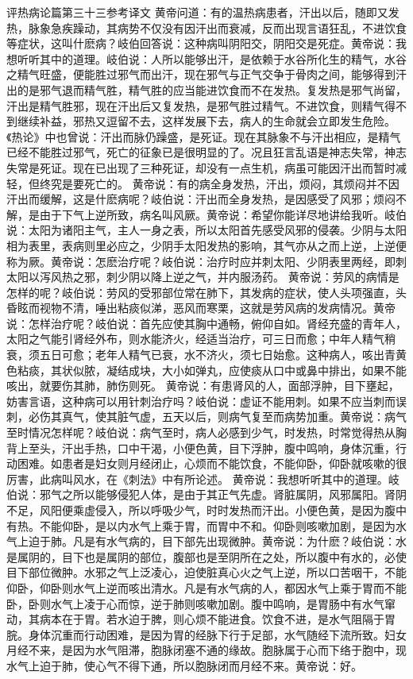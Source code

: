 \documentclass[a4paper,12pt,UTF8,twoside]{ctexbook}
\begin{document}
评热病论篇第三十三参考译文
黄帝问道：有的温热病患者，汗出以后，随即又发热，脉象急疾躁动，其病势不仅没有因汗出而衰减，反而出现言语狂乱，不进饮食等症状，这叫什麽病？岐伯回答说：这种病叫阴阳交，阴阳交是死症。黄帝说：我想听听其中的道理。岐伯说：人所以能够出汗，是依赖于水谷所化生的精气，水谷之精气旺盛，便能胜过邪气而出汗，现在邪气与正气交争于骨肉之间，能够得到汗出的是邪气退而精气胜，精气胜的应当能进饮食而不在发热。复发热是邪气尚留，汗出是精气胜邪，现在汗出后又复发热，是邪气胜过精气。不进饮食，则精气得不到继续补益，邪热又逗留不去，这样发展下去，病人的生命就会立即发生危险。《热论》中也曾说：汗出而脉仍躁盛，是死证。现在其脉象不与汗出相应，是精气已经不能胜过邪气，死亡的征象已是很明显的了。况且狂言乱语是神志失常，神志失常是死证。现在已出现了三种死证，却没有一点生机，病虽可能因汗出而暂时减轻，但终究是要死亡的。
黄帝说：有的病全身发热，汗出，烦闷，其烦闷并不因汗出而缓解，这是什麽病呢？岐伯说：汗出而全身发热，是因感受了风邪；烦闷不解，是由于下气上逆所致，病名叫风厥。黄帝说：希望你能详尽地讲给我听。岐伯说：太阳为诸阳主气，主人一身之表，所以太阳首先感受风邪的侵袭。少阴与太阳相为表里，表病则里必应之，少阴手太阳发热的影响，其气亦从之而上逆，上逆便称为厥。黄帝说：怎麽治疗呢？岐伯说：治疗时应并刺太阳、少阴表里两经，即刺太阳以泻风热之邪，刺少阴以降上逆之气，并内服汤药。
黄帝说：劳风的病情是怎样的呢？岐伯说：劳风的受邪部位常在肺下，其发病的症状，使人头项强直，头昏眩而视物不清，唾出粘痰似涕，恶风而寒栗，这就是劳风病的发病情况。黄帝说：怎样治疗呢？岐伯说：首先应使其胸中通畅，俯仰自如。肾经充盛的青年人，太阳之气能引肾经外布，则水能济火，经适当治疗，可三日而愈；中年人精气稍衰，须五日可愈；老年人精气已衰，水不济火，须七日始愈。这种病人，咳出青黄色粘痰，其状似脓，凝结成块，大小如弹丸，应使痰从口中或鼻中排出，如果不能咳出，就要伤其肺，肺伤则死。
黄帝说：有患肾风的人，面部浮肿，目下壅起，妨害言语，这种病可以用针刺治疗吗？岐伯说：虚证不能用刺。如果不应当刺而误刺，必伤其真气，使其脏气虚，五天以后，则病气复至而病势加重。黄帝说：病气至时情况怎样呢？岐伯说：病气至时，病人必感到少气，时发热，时常觉得热从胸背上至头，汗出手热，口中干渴，小便色黄，目下浮肿，腹中鸣响，身体沉重，行动困难。如患者是妇女则月经闭止，心烦而不能饮食，不能仰卧，仰卧就咳嗽的很厉害，此病叫风水，在《刺法》中有所论述。
黄帝说：我想听听其中的道理。岐伯说：邪气之所以能够侵犯人体，是由于其正气先虚。肾脏属阴，风邪属阳。肾阴不足，风阳便乘虚侵入，所以呼吸少气，时时发热而汗出。小便色黄，是因为腹中有热。不能仰卧，是以内水气上乘于胃，而胃中不和。仰卧则咳嗽加剧，是因为水气上迫于肺。凡是有水气病的，目下部先出现微肿。黄帝说：为什麽？岐伯说：水是属阴的，目下也是属阴的部位，腹部也是至阴所在之处，所以腹中有水的，必使目下部位微肿。水邪之气上泛凌心，迫使脏真心火之气上逆，所以口苦咽干，不能仰卧，仰卧则水气上逆而咳出清水。凡是有水气病的人，都因水气上乘于胃而不能卧，卧则水气上凌于心而惊，逆于肺则咳嗽加剧。腹中鸣响，是胃肠中有水气窜动，其病本在于胃。若水迫于脾，则心烦不能进食。饮食不进，是水气阻隔于胃脘。身体沉重而行动困难，是因为胃的经脉下行于足部，水气随经下流所致。妇女月经不来，是因为水气阻滞，胞脉闭塞不通的缘故。胞脉属于心而下络于胞中，现水气上迫于肺，使心气不得下通，所以胞脉闭而月经不来。黄帝说：好。
\end{document}
